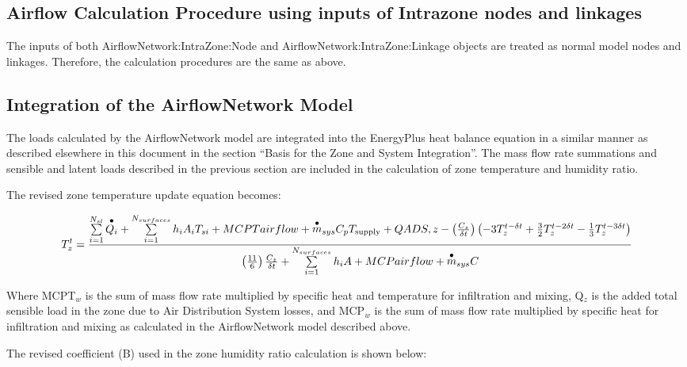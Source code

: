 \subsection{Airflow Calculation Procedure using inputs of Intrazone nodes and linkages}\label{airflow-calculation-procedure-using-inputs-of-intrazone-nodes-and-linkages}

The inputs of both AirflowNetwork:IntraZone:Node and AirflowNetwork:IntraZone:Linkage objects are treated as normal model nodes and linkages. Therefore, the calculation procedures are the same as above.

\subsection{Integration of the AirflowNetwork Model}\label{integration-of-the-airflownetwork-model}

The loads calculated by the AirflowNetwork model are integrated into the EnergyPlus heat balance equation in a similar manner as described elsewhere in this document in the section ``Basis for the Zone and System Integration''. The mass flow rate summations and sensible and latent loads described in the previous section are included in the calculation of zone temperature and humidity ratio.

The revised zone temperature update equation becomes:

{\scriptsize
\begin{equation}
T_z^t = \frac{{\sum\limits_{i = 1}^{{N_{sl}}} {\mathop {{Q_i}}\limits^ \bullet  }  + \sum\limits_{i = 1}^{{N_{surfaces}}} {{h_i}} {A_i}{T_{si}} + MCPTairflow + {{\mathop m\limits^ \bullet  }_{sys}}{C_p}{T_{{\rm{supply}}}} + QADS,z - \left( {\frac{{{C_z}}}{{\delta t}}} \right)\left( { - 3T_z^{t - \delta t} + \frac{3}{2}T_z^{t - 2\delta t} - \frac{1}{3}T_z^{t - 3\delta t}} \right)}}{{\left( {\frac{{11}}{6}} \right)\frac{{{C_z}}}{{\delta t}} + \sum\limits_{i = 1}^{{N_{surfaces}}} {{h_i}} A + MCPairflow + {{\mathop m\limits^ \bullet  }_{sys}}C}}
\end{equation}}

Where MCPT\(_{w}\) is the sum of mass flow rate multiplied by specific heat and temperature for infiltration and mixing, Q\(_{z}\) is the added total sensible load in the zone due to Air Distribution System losses, and MCP\(_{w}\) is the sum of mass flow rate multiplied by specific heat for infiltration and mixing as calculated in the AirflowNetwork model described above.

The revised coefficient (B) used in the zone humidity ratio calculation is shown below:

